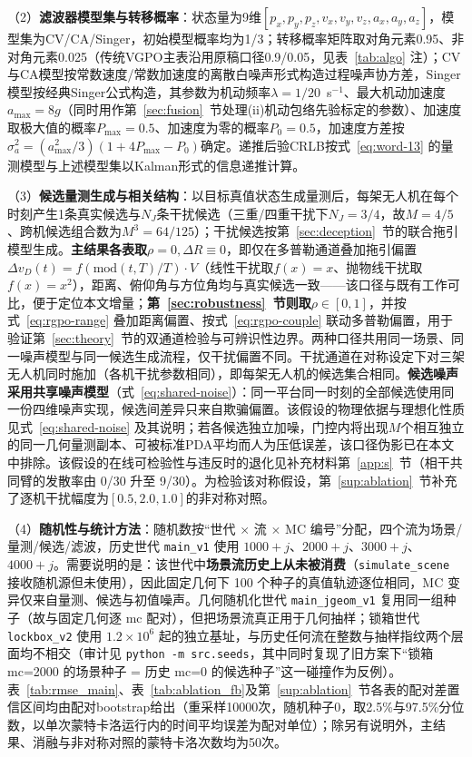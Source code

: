 \documentclass[UTF8,a4paper,zihao=-4]{ctexart}
\begin{document}
（2）\textbf{滤波器模型集与转移概率}：状态量为9维\([p_x,p_y,p_z,v_x,v_y,v_z,a_x,a_y,a_z]\)，模型集为CV/CA/Singer，初始模型概率均为1/3；转移概率矩阵取对角元素0.95、非对角元素0.025（传统VGPO主表沿用原稿口径0.9/0.05，见表~\ref{tab:algo} 注）；CV与CA模型按常数速度/常数加速度的离散白噪声形式构造过程噪声协方差，Singer模型按经典Singer公式\cite{singer1970}构造，其参数为机动频率\(\lambda=1/20\)~s\(^{-1}\)、最大机动加速度\(a_{\max}=8g\)（同时用作第~\ref{sec:fusion}~节处理(ii)机动包络先验标定的参数）、加速度取极大值的概率\(P_{\max}=0.5\)、加速度为零的概率\(P_0=0.5\)，加速度方差按\(\sigma_a^2=(a_{\max}^2/3)(1+4P_{\max}-P_0)\)确定。递推后验CRLB按式~\eqref{eq:word-13} 的量测模型与上述模型集以Kalman形式的信息递推计算。

（3）\textbf{候选量测生成与相关结构}：以目标真值状态生成量测后，每架无人机在每个时刻产生1条真实候选与\(N_J\)条干扰候选（三重/四重干扰下\(N_J=3/4\)，故\(M=4/5\)、跨机候选组合数为\(M^3=64/125\)）；干扰候选按第~\ref{sec:deception}~节的联合拖引模型生成。\textbf{主结果各表取\(\rho=0,\Delta R\equiv0\)}，即仅在多普勒通道叠加拖引偏置\(\Delta v_D(t)=f\!\left(\mathrm{mod}(t,T)/T\right)\cdot V\)（线性干扰取\(f(x)=x\)、抛物线干扰取\(f(x)=x^2\)），距离、俯仰角与方位角均与真实候选一致——该口径与既有工作可比，便于定位本文增量；\textbf{第~\ref{sec:robustness}~节则取\(\rho\in[0,1]\)}，并按式~\eqref{eq:rgpo-range} 叠加距离偏置、按式~\eqref{eq:rgpo-couple} 联动多普勒偏置，用于验证第~\ref{sec:theory}~节的双通道检验与可辨识性边界。两种口径共用同一场景、同一噪声模型与同一候选生成流程，仅干扰偏置不同。干扰通道在对称设定下对三架无人机同时施加（各机干扰参数相同），即每架无人机的候选集合相同。\textbf{候选噪声采用共享噪声模型}（式~\eqref{eq:shared-noise}）：同一平台同一时刻的全部候选使用同一份四维噪声实现，候选间差异只来自欺骗偏置。该假设的物理依据与理想化性质见式~\eqref{eq:shared-noise} 及其说明；若各候选独立加噪，门控内将出现\(M\)个相互独立的同一几何量测副本、可被标准PDA平均而人为压低误差，该口径伪影已在本文中排除。该假设的在线可检验性与违反时的退化见补充材料第~\ref{app:s}~节（相干共同臂的发散率由 0/30 升至 9/30）。为检验该对称假设，第~\ref{sup:ablation}~节补充了逐机干扰幅度为\([0.5,2.0,1.0]\)的非对称对照。

（4）\textbf{随机性与统计方法}：随机数按“世代 $\times$ 流 $\times$ MC 编号”分配，四个流为场景/量测/候选/滤波，历史世代 \texttt{main\_v1} 使用 \(1000+j\)、\(2000+j\)、\(3000+j\)、\(4000+j\)。需要说明的是：该世代中\textbf{场景流历史上从未被消费}（\texttt{simulate\_scene} 接收随机源但未使用），因此固定几何下 100 个种子的真值轨迹逐位相同，MC 变异仅来自量测、候选与初值噪声。几何随机化世代 \texttt{main\_jgeom\_v1} 复用同一组种子（故与固定几何逐 mc 配对），但把场景流真正用于几何抽样；锁箱世代 \texttt{lockbox\_v2} 使用 \(1.2\times10^{6}\) 起的独立基址，与历史任何流在整数与抽样指纹两个层面均不相交（审计见 \texttt{python -m src.seeds}，其中同时复现了旧方案下“锁箱 mc=2000 的场景种子 = 历史 mc=0 的候选种子”这一碰撞作为反例）。表~\ref{tab:rmse_main}、表~\ref{tab:ablation_fb}及第~\ref{sup:ablation}~节各表的配对差置信区间均由配对bootstrap给出（重采样10000次，随机种子0，取2.5\%与97.5\%分位数，以单次蒙特卡洛运行内的时间平均误差为配对单位）；除另有说明外，主结果、消融与非对称对照的蒙特卡洛次数均为50次。
\end{document}
